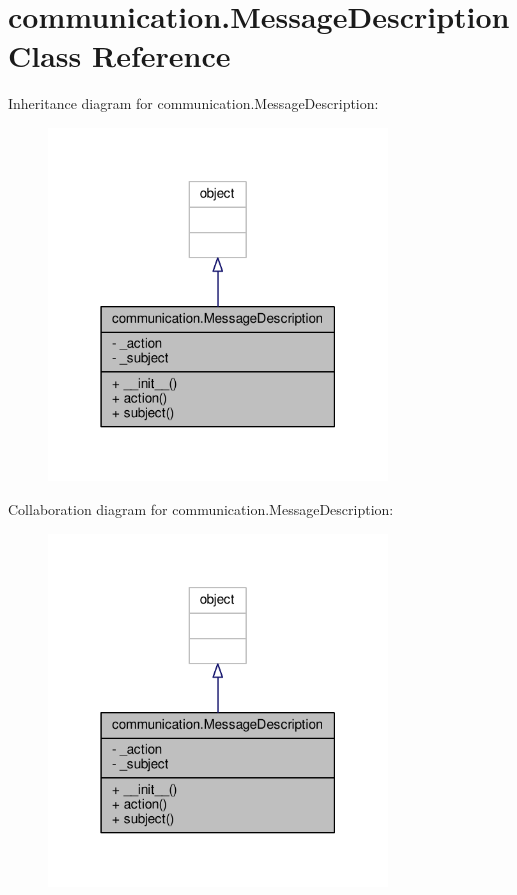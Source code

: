 \hypertarget{classcommunication_1_1MessageDescription}{}\section{communication.\+Message\+Description Class Reference}
\label{classcommunication_1_1MessageDescription}


Inheritance diagram for communication.\+Message\+Description\+:\nopagebreak
\begin{figure}[H]
\begin{center}
\leavevmode
\includegraphics[width=255pt]{classcommunication_1_1MessageDescription__inherit__graph}
\end{center}
\end{figure}


Collaboration diagram for communication.\+Message\+Description\+:\nopagebreak
\begin{figure}[H]
\begin{center}
\leavevmode
\includegraphics[width=255pt]{classcommunication_1_1MessageDescription__coll__graph}
\end{center}
\end{figure}
